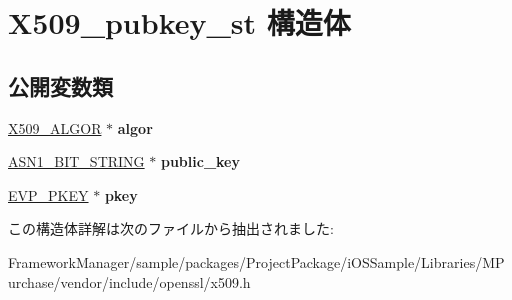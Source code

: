 \hypertarget{struct_x509__pubkey__st}{}\section{X509\+\_\+pubkey\+\_\+st 構造体}
\label{struct_x509__pubkey__st}
\subsection*{公開変数類}
\begin{DoxyCompactItemize}
\item 
\hypertarget{struct_x509__pubkey__st_a0fb9c56d9396c7fffdb67e9c758be102}{}\hyperlink{struct_x509__algor__st}{X509\+\_\+\+A\+L\+G\+O\+R} $\ast$ {\bfseries algor}\label{struct_x509__pubkey__st_a0fb9c56d9396c7fffdb67e9c758be102}

\item 
\hypertarget{struct_x509__pubkey__st_ae2fae3c3fa6b2d0a28b5873da1361250}{}\hyperlink{structasn1__string__st}{A\+S\+N1\+\_\+\+B\+I\+T\+\_\+\+S\+T\+R\+I\+N\+G} $\ast$ {\bfseries public\+\_\+key}\label{struct_x509__pubkey__st_ae2fae3c3fa6b2d0a28b5873da1361250}

\item 
\hypertarget{struct_x509__pubkey__st_a3ffae0e6f6a9c34c52339de00d8a8234}{}\hyperlink{structevp__pkey__st}{E\+V\+P\+\_\+\+P\+K\+E\+Y} $\ast$ {\bfseries pkey}\label{struct_x509__pubkey__st_a3ffae0e6f6a9c34c52339de00d8a8234}

\end{DoxyCompactItemize}


この構造体詳解は次のファイルから抽出されました\+:\begin{DoxyCompactItemize}
\item 
Framework\+Manager/sample/packages/\+Project\+Package/i\+O\+S\+Sample/\+Libraries/\+M\+Purchase/vendor/include/openssl/x509.\+h\end{DoxyCompactItemize}
